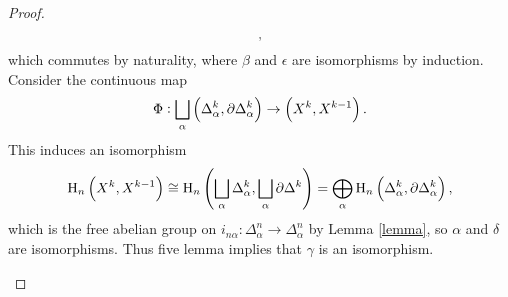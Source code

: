 \begin{proof}
\begin{itemize}[leftmargin=2cm]
$$\begin{tikzcd}[column sep=tiny]
\end{tikzcd},
$$
which commutes by naturality, where $ \beta $ and $ \epsilon $ are isomorphisms by induction. Consider the continuous map
$$ \Phi : \bigsqcup_\alpha \br{\Delta_\alpha^k, \partial\Delta_\alpha^k} \to \br{X^k, X^{k - 1}}. $$
This induces an isomorphism
$$ \H_n\br{X^k, X^{k - 1}} \cong \H_n\br{\bigsqcup_\alpha \Delta_\alpha^k, \bigsqcup_\alpha \partial\Delta^k} = \bigoplus_\alpha \H_n\br{\Delta_\alpha^k, \partial\Delta_\alpha^k}, $$
which is the free abelian group on $ i_{n\alpha} : \Delta_\alpha^n \to \Delta_\alpha^n $ by Lemma \ref{lemma}, so $ \alpha $ and $ \delta $ are isomorphisms. Thus five lemma implies that $ \gamma $ is an isomorphism.
\end{itemize}
\end{proof}

